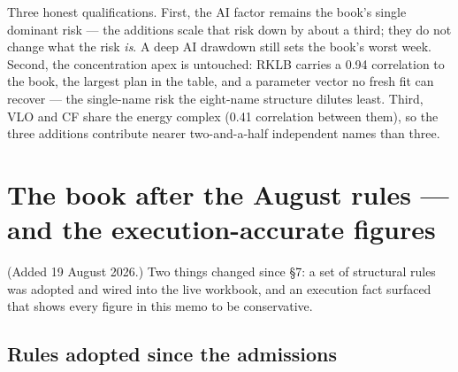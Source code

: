 \documentclass[11pt,a4paper]{article}
\begin{document}
Three honest qualifications. First, the AI factor remains the book's single
dominant risk --- the additions scale that risk down by about a third; they do not
change what the risk \emph{is}. A deep AI drawdown still sets the book's worst
week. Second, the concentration apex is untouched: RKLB carries a 0.94 correlation
to the book, the largest plan in the table, and a parameter vector no fresh fit can
recover --- the single-name risk the eight-name structure dilutes least. Third, VLO
and CF share the energy complex (0.41 correlation between them), so the three
additions contribute nearer two-and-a-half independent names than three.

\section{The book after the August rules --- and the execution-accurate figures}

(Added 19 August 2026.) Two things changed since \S7: a set of structural rules
was adopted and wired into the live workbook, and an execution fact surfaced
that shows every figure in this memo to be conservative.

\subsection{Rules adopted since the admissions}
\end{document}
